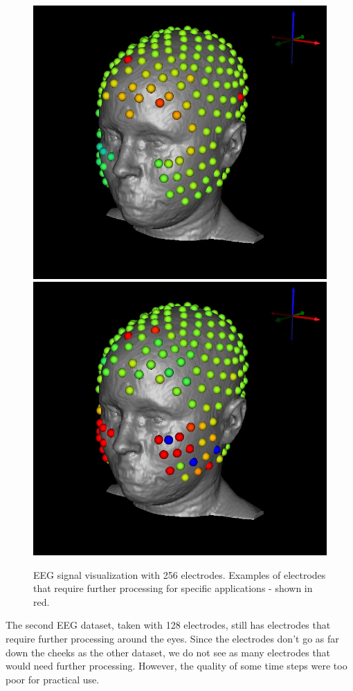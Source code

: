 \begin{figure}[H]
\begin{center}
\includegraphics[width=.49\textwidth]{Figures/eeg_1}
\includegraphics[width=.49\textwidth]{Figures/eeg_2}
\caption{EEG signal visualization with 256 electrodes. Examples of electrodes that require further processing for specific applications - shown in red.}
\label{fig:eegvis}
\end{center}
\end{figure}
The second EEG dataset, taken with 128 electrodes, still has electrodes that require further processing around the eyes. Since the electrodes don't go as far down the cheeks as the other dataset, we do not see as many electrodes that would need further processing. However, the quality of some time steps were too poor for practical use. 

